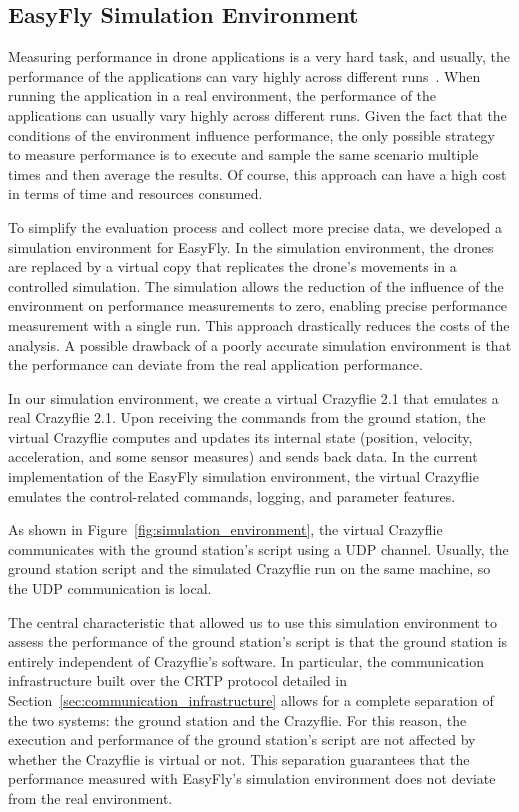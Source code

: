 \subsection{EasyFly Simulation Environment}\label{subsec:simulation_environment}
Measuring performance in drone applications is a very hard task, and usually, the performance of the applications can vary highly across different runs~\cite{afanasov2019flyzone}.
When running the application in a real environment, the performance of the applications can usually vary highly across different runs.
Given the fact that the conditions of the environment influence performance, the only possible strategy to measure performance is to execute and sample the same scenario multiple times and then average the results.
Of course, this approach can have a high cost in terms of time and resources consumed.

To simplify the evaluation process and collect more precise data, we developed a simulation environment for EasyFly.
In the simulation environment, the drones are replaced by a virtual copy that replicates the drone's movements in a controlled simulation.
The simulation allows the reduction of the influence of the environment on performance measurements to zero, enabling precise performance measurement with a single run.
This approach drastically reduces the costs of the analysis.
A possible drawback of a poorly accurate simulation environment is that the performance can deviate from the real application performance.

In our simulation environment, we create a virtual Crazyflie 2.1 that emulates a real Crazyflie 2.1.
Upon receiving the commands from the ground station, the virtual Crazyflie computes and updates its internal state (position, velocity, acceleration, and some sensor measures) and sends back data.
In the current implementation of the EasyFly simulation environment, the virtual Crazyflie emulates the control-related commands, logging, and parameter features.

As shown in Figure~\ref{fig:simulation_environment}, the virtual Crazyflie communicates with the ground station's script using a UDP channel.
Usually, the ground station script and the simulated Crazyflie run on the same machine, so the UDP communication is local.

The central characteristic that allowed us to use this simulation environment to assess the performance of the ground station's script is that the ground station is entirely independent of Crazyflie's software. 
In particular, the communication infrastructure built over the CRTP protocol detailed in Section~\ref{sec:communication_infrastructure} allows for a complete separation of the two systems: the ground station and the Crazyflie.
For this reason, the execution and performance of the ground station's script are not affected by whether the Crazyflie is virtual or not.
This separation guarantees that the performance measured with EasyFly's simulation environment does not deviate from the real environment.

